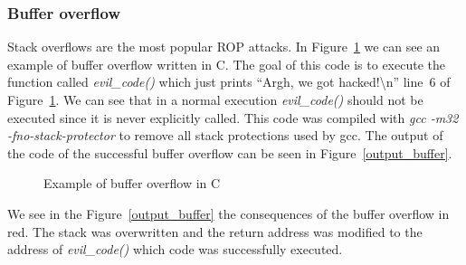 \documentclass[11pt]{sdm}
\begin{document}
\subsubsection{Buffer overflow}
\label{ssub:Buffer overflow}

Stack overflows are the most popular ROP attacks. In Figure~\ref{buffer_overflow_code} we can see an example of buffer overflow written in C.
The goal of this code is to execute the function called \textit{evil\_code()} which just prints ``Argh, we got hacked!\textbackslash{n}'' line~6 of Figure~\ref{buffer_overflow_code}. We can see that in a normal execution \textit{evil\_code()} should not be executed since it is never explicitly called. 
This code was compiled with \textit{gcc -m32 -fno-stack-protector} to remove all stack protections used by gcc. The output of the code of the successful buffer overflow can be seen in Figure~\ref{output_buffer}.
\begin{figure}[!ht]

\centering
\caption{Example of buffer overflow in C}
\label{buffer_overflow_code}
\end{figure}

We see in the Figure~\ref{output_buffer} the consequences of the buffer overflow in red. The stack was overwritten and the return address was modified to the address of \textit{evil\_code()} which code was successfully executed.
\end{document}
